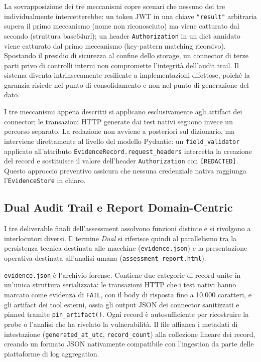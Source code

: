 La sovrapposizione dei tre meccanismi copre scenari che nessuno dei tre individualmente intercetterebbe: un token \gls{JWT} in una chiave \texttt{"result"} arbitraria supera il primo meccanismo (nome non riconosciuto) ma viene catturato dal secondo (struttura base64url); un header \texttt{Authorization} in un dict annidato viene catturato dal primo meccanismo (key-pattern matching ricorsivo). Spostando il presidio di sicurezza al confine dello storage, un connector di terze parti privo di controlli interni non compromette l'integrità dell'audit trail. Il sistema diventa intrinsecamente resiliente a implementazioni difettose, poiché la garanzia risiede nel punto di consolidamento e non nel punto di generazione del dato.

I tre meccanismi appena descritti si applicano esclusivamente agli artifact dei connector; le transazioni \gls{HTTP} generate dai test nativi seguono invece un percorso separato. La redazione non avviene a posteriori sul dizionario, ma interviene direttamente al livello del modello Pydantic: un \texttt{field\_validator} applicato all'attributo \texttt{EvidenceRecord.request\_headers} intercetta la creazione del record e sostituisce il valore dell'header \texttt{Authorization} con \texttt{[REDACTED]}. Questo approccio preventivo assicura che nessuna credenziale nativa raggiunga l'\texttt{EvidenceStore} in chiaro.

\subsection{Dual Audit Trail e Report Domain-Centric}\label{subsec:dual-audit-trail}

I tre deliverable finali dell'assessment assolvono funzioni distinte e si rivolgono a interlocutori diversi.
Il termine \textit{Dual} si riferisce quindi al parallelismo tra la persistenza tecnica destinata alle macchine (\texttt{evidence.json}) e la presentazione operativa destinata all'analisi umana (\texttt{assessment\_report.html}).


\texttt{evidence.json} è l'archivio forense. Contiene due categorie di record unite in un'unica struttura serializzata: le transazioni \gls{HTTP} che i test nativi hanno marcato come evidenza di \texttt{FAIL}, con il body di risposta fino a 10.000 caratteri, e gli artifact dei tool esterni, ossia gli output \gls{JSON} dei connector sanitizzati e pinned tramite \texttt{pin\_artifact()}. Ogni record è autosufficiente per ricostruire la probe o l'analisi che ha rivelato la vulnerabilità. Il file affianca i metadati di intestazione (\texttt{generated\_at\_utc}, \texttt{record\_count}) alla collezione lineare dei record, creando un formato \gls{JSON} nativamente compatibile con l'ingestion da parte delle piattaforme di log aggregation.


